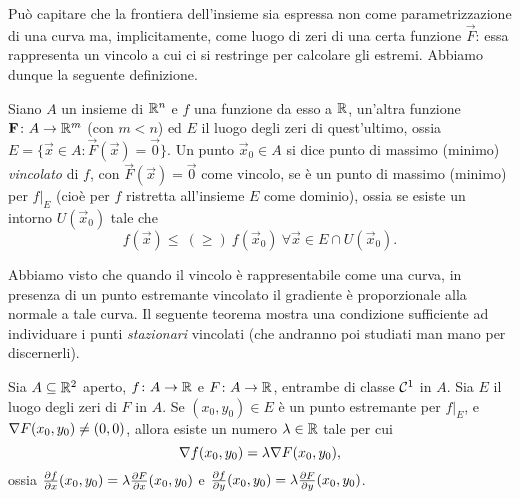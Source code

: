 Può capitare che la frontiera dell'insieme sia espressa non come parametrizzazione di una curva ma, implicitamente, come luogo di zeri di una certa funzione $\vec F$: essa rappresenta un vincolo a cui ci si restringe per calcolare gli estremi.
Abbiamo dunque la seguente definizione.
\begin{definizione} \label{d:estremi-vincolati}
	Siano $A$ un insieme di $\mathbb{R}^n$ e $f$ una funzione da esso a $\mathbb{R}$, un'altra funzione $\mathbf{F}\colon A\to\mathbb{R}^m$ (con $m<n$) ed $E$ il luogo degli zeri di quest'ultimo, ossia $E=\{\vec x\in A\colon \vec F(\vec x)=\vec 0\}$.
	Un punto $\vec x_0\in A$ si dice punto di massimo (minimo) \emph{vincolato} di $f$, con $\vec F(\vec x)=\vec 0$ come vincolo, se è un punto di massimo (minimo) per $f|_E$ (cioè per $f$ ristretta all'insieme $E$ come dominio), ossia se esiste un intorno $U(\vec x_0)$ tale che
	\begin{equation*}
		f(\vec x)\leq\ (\geq)\ f(\vec x_0)\ \forall\vec x\in E\cap U(\vec x_0).
	\end{equation*}
\end{definizione}
Abbiamo visto che quando il vincolo è rappresentabile come una curva, in presenza di un punto estremante vincolato il gradiente è proporzionale alla normale a tale curva.
Il seguente teorema mostra una condizione sufficiente ad individuare i punti \emph{stazionari} vincolati (che andranno poi studiati man mano per discernerli).
\begin{teorema} \label{t:moltiplicatori-lagrange-R2}
	Sia $A\subseteq\mathbb{R}^2$ aperto, $f\colon A\to\mathbb{R}$ e $F\colon A\to\mathbb{R}$, entrambe di classe $\mathcal{C}^{{1}}$ in $A$. Sia $E$ il luogo degli zeri di $F$ in $A$. Se $(x_0,y_0)\in E$ è un punto estremante per $f|_E$, e $\nabla F(x_0,y_0)\neq(0,0)$, allora esiste un numero $\lambda\in\mathbb{R}$ tale per cui
	\begin{equation} 
		\nabla f(x_0,y_0)=\lambda\nabla F(x_0,y_0),
		\label{eq:moltiplicatori-lagrange-R2}
	\end{equation}
	ossia $\frac{\partial {f}}{\partial {x}}(x_0,y_0)=\lambda\frac{\partial {F}}{\partial {x}}(x_0,y_0)$ e $\frac{\partial {f}}{\partial {y}}(x_0,y_0)=\lambda\frac{\partial {F}}{\partial {y}}(x_0,y_0)$.
\end{teorema}
